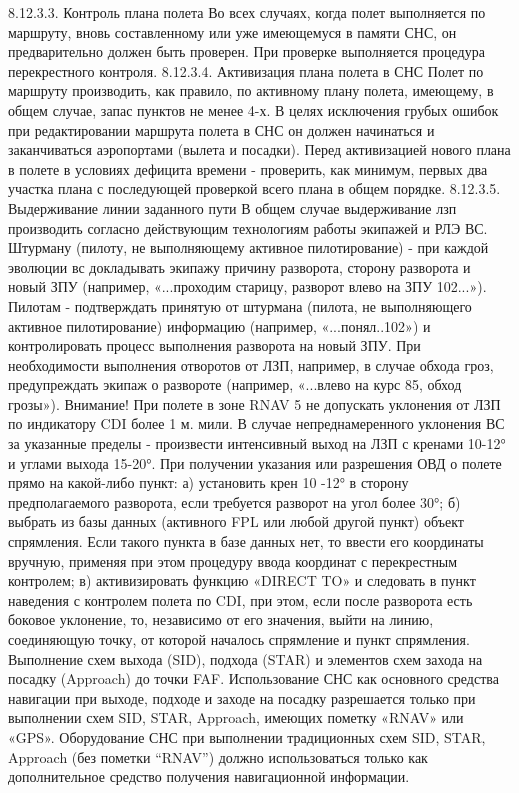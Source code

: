 8.12.3.3.	Контроль плана полета
Во всех случаях, когда полет выполняется по маршруту, вновь составленному или уже имеющемуся в памяти СНС, он предварительно должен быть проверен. При проверке выполняется процедура перекрестного контроля.
8.12.3.4.	Активизация плана полета в СНС
Полет по маршруту производить, как правило, по активному плану полета, имеющему, в общем случае, запас пунктов не менее 4-х. В целях исключения грубых ошибок при редактировании маршрута полета в СНС он должен начинаться и заканчиваться аэропортами (вылета и посадки).
Перед активизацией нового плана в полете в условиях дефицита времени - проверить, как минимум, первых два участка плана с последующей проверкой всего плана в общем порядке.
8.12.3.5.	Выдерживание линии заданного пути 
В общем случае выдерживание лзп производить согласно действующим технологиям работы экипажей и РЛЭ ВС. Штурману (пилоту, не выполняющему активное пилотирование) - при каждой эволюции вс докладывать экипажу причину разворота, сторону разворота и новый ЗПУ (например, «...проходим старицу, разворот влево на ЗПУ 102...»). Пилотам - подтверждать принятую от штурмана (пилота, не выполняющего активное пилотирование) информацию (например, «...понял..102») и контролировать процесс выполнения разворота на новый ЗПУ. 
При необходимости выполнения отворотов от ЛЗП, например, в случае обхода гроз, предупреждать экипаж о развороте (например, «...влево на курс 85, обход грозы»).
Внимание! При полете в зоне RNAV 5 не допускать уклонения от ЛЗП по индикатору CDI более 1 м. мили. В случае непреднамеренного уклонения ВС за указанные пределы - произвести интенсивный выход на ЛЗП с кренами 10-12° и углами выхода 15-20°. 
При получении указания или разрешения ОВД о полете прямо на какой-либо пункт:
а)	установить крен 10 -12° в сторону предполагаемого разворота, если требуется разворот на угол более 30°;
б)	выбрать из базы данных (активного FPL или любой другой пункт) объект спрямления. Если такого пункта в базе данных нет, то ввести его координаты вручную, применяя при этом процедуру ввода координат с перекрестным контролем;
в)	активизировать функцию «DIRECT TO» и следовать в пункт наведения с контролем полета по CDI, при этом, если после разворота есть боковое уклонение, то, независимо от его значения, выйти на линию, соединяющую точку, от которой началось спрямление и пункт спрямления. 
Выполнение схем выхода (SID), подхода (STAR) и элементов схем захода на посадку (Approach) до точки FAF.
Использование СНС как основного средства навигации при выходе, подходе и заходе на посадку разрешается только при выполнении схем SID, STAR, Approach, имеющих пометку «RNAV» или «GPS». Оборудование СНС при выполнении традиционных схем SID, STAR, Approach (без пометки “RNAV”) должно использоваться только как дополнительное средство получения навигационной информации.
